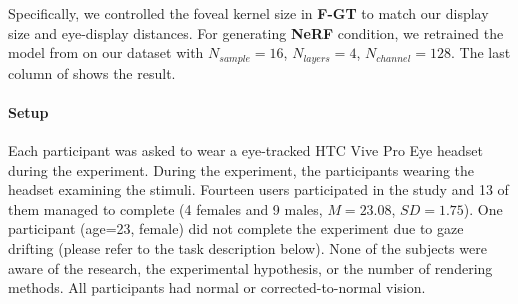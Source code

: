Specifically, we controlled the foveal kernel size in {\bf F-GT} to match our display size and eye-display distances.
For generating {\bf NeRF} condition, we retrained the model from \cite{mildenhall2020nerf} on our dataset with $N_{sample}=16$, $N_{layers}=4$, $N_{channel}=128$. The last column of  shows the result. 


\paragraph{Setup}
Each participant was asked to wear a eye-tracked HTC Vive Pro Eye headset during the experiment. During the experiment, the participants wearing the headset examining  the stimuli. 
Fourteen users participated in the study and 13 of them managed to complete (4 females and 9 males, $M=23.08$, $SD=1.75$). One participant (age=23, female) did not complete the experiment due to gaze drifting (please refer to the task description below).
None of the subjects were aware of the research, the experimental hypothesis, or the number of rendering methods. All participants had normal or corrected-to-normal vision.

